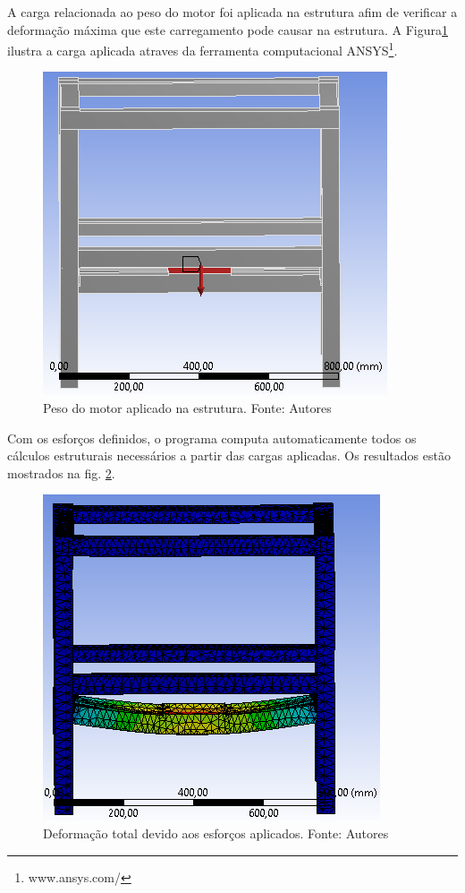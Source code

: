     A carga relacionada ao peso do motor foi aplicada na estrutura afim de verificar a deformação máxima que este carregamento pode causar na estrutura. A  Figura\ref{fig:carga_motor} ilustra a carga aplicada atraves da ferramenta computacional ANSYS\footnote{www.ansys.com/}.

  \begin{figure}[H]
      \centering
      \includegraphics[scale=0.7]{figuras/carga_motor.png}
      \caption{Peso do motor aplicado na estrutura. Fonte: Autores}
      \label{fig:carga_motor}
      \end{figure}

      Com os esforços definidos, o programa computa automaticamente todos os cálculos estruturais necessários a partir das cargas aplicadas. Os resultados estão mostrados na fig. \ref{fig:def_motor}.

  \begin{figure}[H]
      \centering
      \includegraphics[scale=0.7]{figuras/def_motor.png}
      \caption{Deformação total devido aos esforços aplicados. Fonte: Autores}
      \label{fig:def_motor}
      \end{figure}

